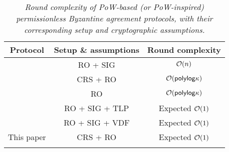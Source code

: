 \begin{table*}[ht]
    \begin{tabularx}{\linewidth}{@{\hskip .25in} c @{\hskip .5in}  c @{\hskip .5in} c @{\hskip .25in}}
        \toprule
        \textbf{Protocol}
         & \textbf{Setup \& assumptions }
         & \textbf{Round complexity}
        \\ \midrule
        \cite{C:AndDzi15}
         & RO + SIG
         & $\mathcal{O}(n)$
        \\ \midrule
        \cite{EC:GarKiaLeo15}
         & CRS + RO
         & $\mathcal{O}(\mathsf{polylog} \kappa)$
        \\ \midrule
        \cite{PKC:GKLP18}
         & RO
         & $\mathcal{O}(\mathsf{polylog} \kappa)$
        \\ \midrule
        \cite{EPRINT:EckFauLos17}
         & RO + SIG + TLP
         & Expected $\mathcal{O}(1)$
        \\ \midrule
        \cite{EPRINT:DEFLM22}
         & RO + SIG + VDF
         & Expected $\mathcal{O}(1)$
        \\ \midrule
        This paper
         & CRS + RO
         & Expected $\mathcal{O}(1)$
        \\ \bottomrule
        \caption{\sl Round complexity of PoW-based (or PoW-inspired) permissionless Byzantine agreement protocols, with their corresponding setup and cryptographic assumptions.}
        \label{table:PoW-BA}
    \end{tabularx}
\end{table*}
